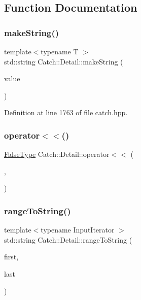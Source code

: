 \subsection{Function Documentation}
\hypertarget{namespace_catch_1_1_detail_aef46b4178e08758524d25d1d969a503c}{}\label{namespace_catch_1_1_detail_aef46b4178e08758524d25d1d969a503c} 
\subsubsection{\texorpdfstring{make\+String()}{makeString()}}
{\footnotesize\ttfamily template$<$typename T $>$ \\
std\+::string Catch\+::\+Detail\+::make\+String (\begin{DoxyParamCaption}\item[{T const \&}]{value }\end{DoxyParamCaption})}



Definition at line 1763 of file catch.\+hpp.

\hypertarget{namespace_catch_1_1_detail_ae9a44d574c4fbd18fabaaee05a433d88}{}\label{namespace_catch_1_1_detail_ae9a44d574c4fbd18fabaaee05a433d88} 
\subsubsection{\texorpdfstring{operator$<$$<$()}{operator<<()}}
{\footnotesize\ttfamily \hyperlink{struct_catch_1_1_detail_1_1_false_type}{False\+Type} Catch\+::\+Detail\+::operator$<$$<$ (\begin{DoxyParamCaption}\item[{std\+::ostream const \&}]{,  }\item[{\hyperlink{struct_catch_1_1_detail_1_1_borg_type}{Borg\+Type} const \&}]{ }\end{DoxyParamCaption})}

\hypertarget{namespace_catch_1_1_detail_a6650a1dff325bf29962ff15ae73fd972}{}\label{namespace_catch_1_1_detail_a6650a1dff325bf29962ff15ae73fd972} 
\subsubsection{\texorpdfstring{range\+To\+String()}{rangeToString()}}
{\footnotesize\ttfamily template$<$typename Input\+Iterator $>$ \\
std\+::string Catch\+::\+Detail\+::range\+To\+String (\begin{DoxyParamCaption}\item[{Input\+Iterator}]{first,  }\item[{Input\+Iterator}]{last }\end{DoxyParamCaption})}



